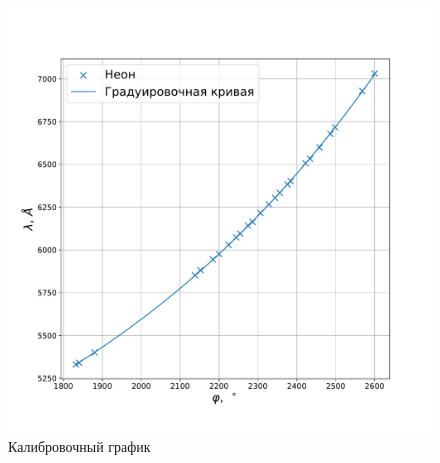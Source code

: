 \documentclass[a4paper, 12pt]{article}
\begin{document}
\begin{figure}[!h]
    \includegraphics[scale = 0.35]{calib}
    \centering
    \caption{Калибровочный график}
    \label{img:calib}
\end{figure}
\end{document}
